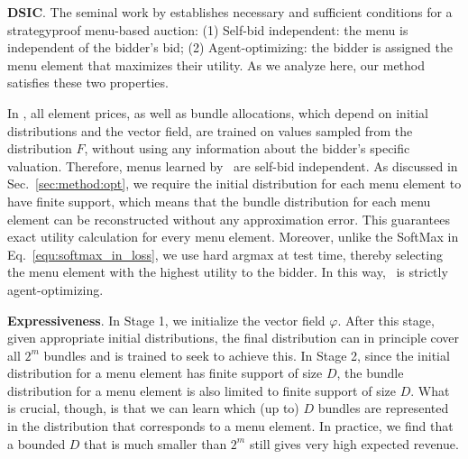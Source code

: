 
\textbf{DSIC}. The seminal work by \citet{hammond1979straightforward} establishes necessary and sufficient conditions for a strategyproof menu-based auction: (1) Self-bid independent: the menu is independent of the bidder's bid; (2) Agent-optimizing: the bidder is assigned the menu element that maximizes their utility. As we analyze here, our method satisfies these two properties.

In \name, all element prices, as well as bundle allocations, which depend on initial distributions and the vector field, are trained on values sampled from the distribution $F$, without using any information about the bidder's specific valuation. Therefore, menus learned by \name~are self-bid independent. 
%
As discussed in Sec.~\ref{sec:method:opt}, we require the initial distribution for each menu
element to have finite support, which means that the bundle distribution for each menu element 
can be reconstructed without any approximation error.
This guarantees exact utility calculation for every menu element. Moreover, unlike the SoftMax in Eq.~\ref{equ:softmax_in_loss}, we use hard argmax at test time, thereby selecting the menu element with the highest utility to the bidder. In this way, \name\ is strictly agent-optimizing.

\textbf{Expressiveness}. In Stage 1, we initialize the vector field $\varphi$. After this stage, given appropriate initial distributions, the final distribution can in principle cover all $2^m$ bundles and is trained to seek to achieve this.
In Stage 2, since the initial distribution for a menu element has finite support of size $D$, the bundle distribution for a menu element is also limited to finite support of size $D$. 
What is crucial, though, is that we can learn which (up to) $D$ bundles are represented in the distribution
that corresponds to a menu element. In practice, we find that a bounded  $D$
that is much smaller than $2^m$ still gives very high expected revenue.



